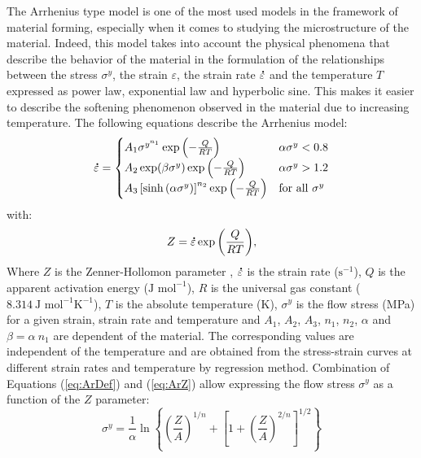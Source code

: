 \documentclass[twoside,english,1p,final,sort&compress]{elsarticle}
\theoremstyle{plain}
\DeclareRobustCommand{\mdot}[1]{\accentset{\mbox{\bfseries .}}{#1}}
\DeclareRobustCommand{\ps}{\text{s}^{-1}}
\begin{document}
The Arrhenius type model \cite{Sellars-1966} is one of the most used models in the framework of material forming, especially when it comes to studying the microstructure of the material.
Indeed, this model takes into account the physical phenomena that describe the behavior of the material in the formulation of the relationships between the stress $\sigma^y$, the strain $\varepsilon$, the strain rate $\mdot\varepsilon$ and the temperature $T$ expressed as power law, exponential law and hyperbolic sine.
This makes it easier to describe the softening phenomenon observed in the material due to increasing temperature.
The following equations describe the Arrhenius model:
\begin{equation}
\mdot\varepsilon =
\begin{cases}
A_1 \sigma^{y^{n_1}} \exp{\left(-\frac{Q}{RT}\right)} & \alpha\sigma^y < 0.8\\
A_2 \exp(\beta\sigma^y) \exp{\left(-\frac{Q}{RT}\right)} & \alpha\sigma^y > 1.2\\
A_3 \left[\sinh{\left(\alpha\sigma^y\right)}\right]^{n_2} \exp{\left(-\frac{Q}{RT}\right)} & \text{for all }\sigma^y
\end{cases}
\label{eq:ArDef}
\end{equation}
with:
\begin{equation}
Z = \mdot\varepsilon \exp{\left(\frac{Q}{RT}\right)}, \label{eq:ArZ}
\end{equation}
Where $Z$ is the Zenner-Hollomon parameter \cite{Zener-1944}, $\mdot\varepsilon$ is the strain rate ($\ps$), $Q$ is the apparent activation energy ($\text{J~mol}^{-1}$), $R$ is the universal gas constant ($8.314~\text{J~mol}^{-1} \text{K}^{-1}$), $T$ is the absolute temperature (K), $\sigma^y$ is the flow stress (MPa) for a given strain, strain rate and temperature and $A_1$, $A_2$, $A_3$, $n_1$, $n_2$, $\alpha$ and $\beta=\alpha~n_1$ are dependent of the material. The corresponding values are independent of the temperature and are obtained from the stress-strain curves at different strain rates and temperature by regression method. Combination of Equations (\ref{eq:ArDef}) and (\ref{eq:ArZ}) allow expressing the flow stress $\sigma^y$ as a function of the $Z$ parameter:
\begin{equation}
\sigma^y = \frac{1}{\alpha} \ln\left\{\left(\frac{Z}{A}\right)^{1/n} + \left[1 + \left(\frac{Z}{A}\right)^{2/n}\right]^{1/2}\right\}
\end{equation}
\end{document}

